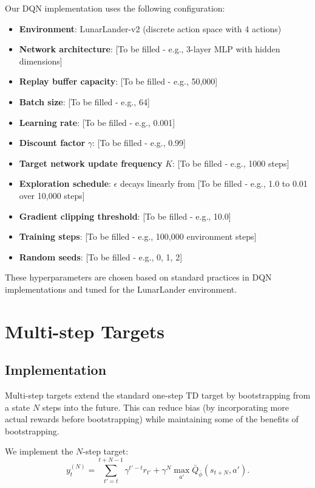 \documentclass[11pt, a4paper, oneside]{memoir}
\begin{document}
Our DQN implementation uses the following configuration:
\begin{itemize}
\item \textbf{Environment}: LunarLander-v2 (discrete action space with 4 actions)
\item \textbf{Network architecture}: [To be filled - e.g., 3-layer MLP with hidden dimensions]
\item \textbf{Replay buffer capacity}: [To be filled - e.g., 50,000]
\item \textbf{Batch size}: [To be filled - e.g., 64]
\item \textbf{Learning rate}: [To be filled - e.g., 0.001]
\item \textbf{Discount factor} $\gamma$: [To be filled - e.g., 0.99]
\item \textbf{Target network update frequency} $K$: [To be filled - e.g., 1000 steps]
\item \textbf{Exploration schedule}: $\epsilon$ decays linearly from [To be filled - e.g., 1.0 to 0.01 over 10,000 steps]
\item \textbf{Gradient clipping threshold}: [To be filled - e.g., 10.0]
\item \textbf{Training steps}: [To be filled - e.g., 100,000 environment steps]
\item \textbf{Random seeds}: [To be filled - e.g., 0, 1, 2]
\end{itemize}

These hyperparameters are chosen based on standard practices in DQN implementations and tuned for the LunarLander environment.

\section{Multi-step Targets}
\label{sec:multistep}

\subsection{Implementation}

Multi-step targets extend the standard one-step TD target by bootstrapping from a state $N$ steps into the future. This can reduce bias (by incorporating more actual rewards before bootstrapping) while maintaining some of the benefits of bootstrapping.

We implement the $N$-step target:
\begin{equation}
y^{(N)}_t = \sum_{t'=t}^{t+N-1} \gamma^{t'-t} r_{t'} + \gamma^N \max_{a'} \bar{Q}_{\bar{\phi}}(s_{t+N}, a').
\end{equation}
\end{document}
